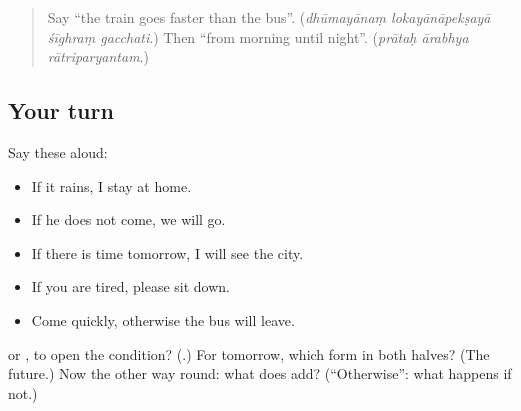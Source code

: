 \label{lesson:SA-R284-if-and-otherwise}



\begin{quote}
Say \textquotedblleft{}the train goes faster than the bus\textquotedblright{}. (\emph{dhūmayānaṃ lokayānāpekṣayā śīghraṃ gacchati}.) Then \textquotedblleft{}from morning until night\textquotedblright{}. (\emph{prātaḥ ārabhya rātriparyantam}.)
\end{quote}

\subsection*{Your turn}
Say these aloud:

\begin{itemize}
\raggedright
  \item If it rains, I stay at home.
  \item If he does not come, we will go.
  \item If there is time tomorrow, I will see the city.
  \item If you are tired, please sit down.
  \item Come quickly, otherwise the bus will leave.
\end{itemize}

\begin{tcolorbox}[breakable,colback=teal!4,colframe=teal!35!black,title={Before you move on}]
\textbf{} or \textbf{}, to open the condition? (\textbf{}.) For tomorrow, which form in both halves? (The future.) Now the other way round: what does \textbf{} add? (\textquotedblleft{}Otherwise\textquotedblright{}: what happens if not.)
\end{tcolorbox}
